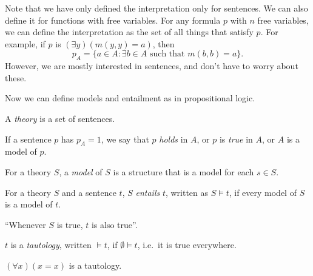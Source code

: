 \documentclass[a4paper]{article}
\begin{document}
Note that we have only defined the interpretation only for sentences. We can also define it for functions with free variables. For any formula $p$ with $n$ free variables, we can define the interpretation as the set of all things that satisfy $p$. For example, if $p$ is $(\exists y)(m(y, y) = a)$, then
\[
  p_A = \{a\in A: \exists b\in A\text{ such that } m(b, b) = a\}.
\]
However, we are mostly interested in sentences, and don't have to worry about these.

Now we can define models and entailment as in propositional logic.
\begin{defi}[Theory]
  A \emph{theory} is a set of sentences.
\end{defi}

\begin{defi}[Model]
  If a sentence $p$ has $p_A = 1$, we say that $p$ \emph{holds} in $A$, or $p$ is \emph{true} in $A$, or $A$ is a model of $p$.

  For a theory $S$, a \emph{model} of $S$ is a structure that is a model for each $s\in S$.
\end{defi}

\begin{defi}
  For a theory $S$ and a sentence $t$, $S$ \emph{entails} $t$, written as $S\models t$, if every model of $S$ is a model of $t$.

  ``Whenever $S$ is true, $t$ is also true''.
\end{defi}

\begin{defi}[Tautology]
  $t$ is a \emph{tautology}, written $\models t$, if $\emptyset\models t$, i.e.\ it is true everywhere.
\end{defi}

\begin{eg}
  $(\forall x)(x = x)$ is a tautology.
\end{eg}
\end{document}
